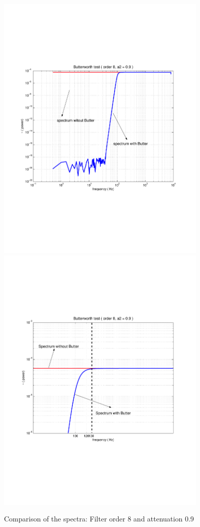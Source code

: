 \begin{figure}
\centering
\includegraphics[width=0.9\textwidth]{figures/testattenuation8_9}
\includegraphics[width=0.9\textwidth]{figures/testattenuation8_9zoomed}
\caption{Comparison of the spectra: Filter order 8 and attenuation 0.9}
\label{fig:testattenuation8_9}
\end{figure}

